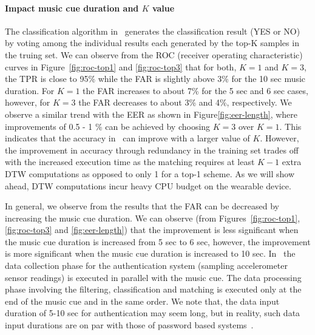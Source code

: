 \paragraph{Impact music cue duration and $K$ value}

The classification algorithm in \systemname~generates the classification result (YES or NO) by voting among the individual results each generated by the top-K samples in the truing set. We can observe from the ROC 
(receiver operating characteristic) curves in Figure~\ref{fig:roc-top1} and \ref{fig:roc-top3} that 
for both, $K=1$ and $K=3$, the TPR is close to 95\% while the FAR is slightly 
above 3\% for the 10 sec music duration. For $K = 1$ the FAR increases to 
about 7\% for the 5 sec and 6 sec cases, however, for $K = 3$ the FAR 
decreases to about 3\% and 4\%, respectively. 
We observe a similar trend with the EER as shown in 
Figure\ref{fig:eer-length}, where improvements of 0.5 - 1 \% 
can be achieved by choosing $K = 3$ over $K = 1$.
This indicates that the accuracy in \systemname~can improve with a larger 
value of $K$. However, the improvement in accuracy through redundancy in the 
training set trades off with the increased execution time as the 
matching requires at least $K - 1$  extra DTW computations as opposed to only 
1 for a top-1 scheme. As we will show ahead, DTW computations incur heavy CPU 
budget on the wearable device. 

In general, we observe from the results that the FAR can 
be decreased by increasing the music cue duration. 
We can observe (from Figures~\ref{fig:roc-top1}, \ref{fig:roc-top3} and 
\ref{fig:eer-length}) that the improvement is less significant when the music 
cue duration is increased from 5 sec to 6 sec, however, the improvement is 
more 
significant when the music cue duration is increased to 10 sec. 
In \systemname~the data collection phase for the authentication system 
(sampling accelerometer sensor readings) is executed in parallel with the 
music cue. The data processing phase involving the filtering, classification 
and matching is executed only at the end of the music cue and in the same 
order.
We note that, the data input duration of 5-10 sec for authentication 
may seem long, but in reality, such data input durations are on par with those 
of password based systems~\cite{von2013patterns}.

